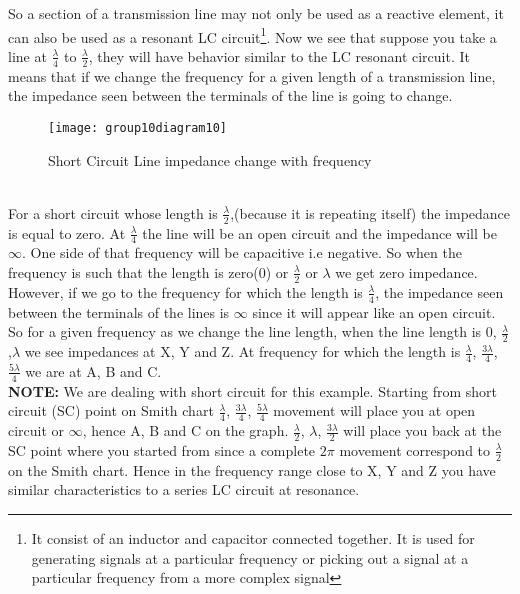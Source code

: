 So a section of a transmission line may not only be used as a reactive element, it can also be used as a resonant LC circuit\footnote{It consist of an inductor and capacitor connected together. It is used for generating signals at a particular frequency or picking out a signal at a particular frequency from a more complex signal}. Now we see that suppose you take a line at $ \frac{\lambda}{4} $ to $ \frac{\lambda}{2} $, they will have behavior similar to the LC resonant circuit.\newline
It means that if we change the frequency for a given length of a transmission line, the impedance seen between the terminals of the line is going to change.\\
\begin{figure}[h]
	\centering
	\texttt{[image: group10diagram10]}
	\caption{Short Circuit Line impedance change with frequency}
\end{figure}\\For a short circuit whose length is $ \frac{\lambda}{2} $,(because it is repeating itself) the impedance is equal to zero. At $ \frac{\lambda}{4} $ the line will be an open circuit and the impedance will be $\infty$. One side of that frequency will be capacitive i.e negative. So when  the frequency is such that the length is zero(0) or $ \frac{\lambda}{2} $ or $ \lambda $ we get zero impedance.\\

However, if we go to the frequency for which the length is $ \frac{\lambda}{4} $, the impedance seen between the terminals of the lines is $\infty$ since it will appear like an open circuit.
So for a given frequency as we change the line length, when the line length is 0, $ \frac{\lambda}{2} $,$ \lambda $ we see impedances at X, Y and Z. At frequency for which the length is $ \frac{\lambda}{4} $, $ \frac{3\lambda}{4} $, $ \frac{5\lambda}{4} $ we are at A, B and C.\\ 
\textbf{NOTE:} We are dealing with short circuit for this example. Starting from short circuit (SC) point on Smith chart $ \frac{\lambda}{4} $, $ \frac{3\lambda}{4} $, $ \frac{5\lambda}{4} $ movement will place you at open circuit or $ \infty $,  hence A, B and C on the graph. $ \frac{\lambda}{2} $, $ \lambda $, $ \frac{3\lambda}{2} $ will place you back at the SC point where you  started from since a complete $ 2\pi $ movement correspond to $ \frac{\lambda}{2} $ on the Smith chart. Hence in the frequency range close to X,
Y and Z you have similar characteristics to a series LC circuit
at resonance.\\

